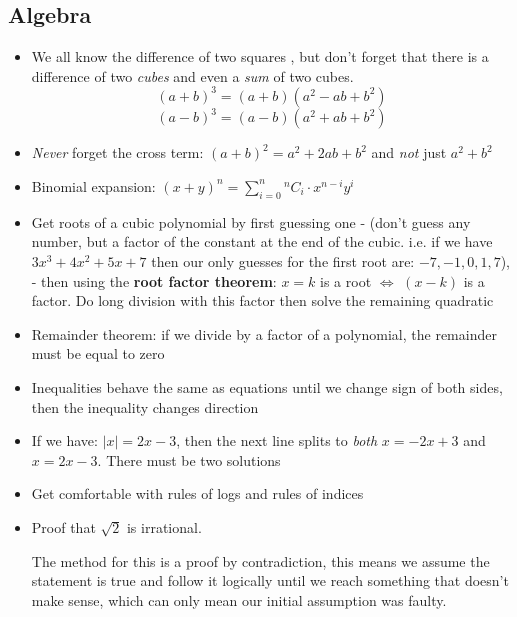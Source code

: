 \documentclass[10pt,a4paper]{article}
\newcommand*{\Comb}[2]{{}^{#1}C_{#2}}
\begin{document}
\subsection{Algebra} 
\begin{itemize}
    \item We all know the difference of two squares , but don't forget that there is a difference of two \textit{cubes} and even a \textit{sum} of two cubes. 
        \begin{equation}
            (a+b)^3 = (a+b)(a^2-ab+b^2)
        \end{equation}
        \begin{equation}
            (a-b)^3 = (a-b)(a^2+ab+b^2)
        \end{equation}
    \item \textit{Never} forget the cross term: $(a+b)^2=a^2 + 2ab + b^2 $ and \textit{not} just $a^2 + b^2$
    \item Binomial expansion: $(x+y)^n = \sum_{i=0}^n \Comb{n}{i} \cdot x^{n-i} y^i$ 
    \item Get roots of a cubic polynomial by first guessing one - (don't guess any number, but a factor of the constant at the end of the cubic. i.e. if we have $3x^3 + 4x^2 + 5x + 7$ then our only guesses for the first root are: $-7,-1,0,1,7$), - then using the \textbf{root factor theorem}: $x=k$ is a root $\iff$ $(x-k)$ is a factor. Do long division with this factor then solve the remaining quadratic
    \item Remainder theorem: if we divide by a factor of a polynomial, the remainder must be equal to zero
    \item Inequalities behave the same as equations until we change sign of both sides, then the inequality changes direction
    \item If we have: $|x| = 2x-3$, then the next line splits to \textit{both} $x=-2x+3$ and $x= 2x-3$. There must be two solutions
    \item Get comfortable with rules of logs and rules of indices
    \item \textcolor{gren2}{Proof} that $\sqrt{2}$ is irrational.
        
        The method for this is a proof by contradiction, this means we assume the statement is true and follow it logically until we reach something that doesn't make sense, which can only mean our initial assumption was faulty.
        

\end{itemize}
\end{document}
